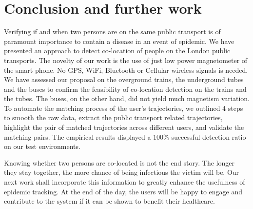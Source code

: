 \documentclass[conference]{IEEEtran}
\begin{document}
\section{Conclusion and further work}
Verifying if and when two persons are on the same public transport is of paramount importance to contain a disease in an event of epidemic. We have presented an approach to detect co-location of people on the London public transports. The novelty of our work is the use of just low power magnetometer of the smart phone. No GPS, WiFi, Bluetooth or Cellular wireless signals is needed. We have assessed our proposal on the overground trains, the underground tubes and the buses to confirm the feasibility of co-location detection on the trains and the tubes. The buses, on the other hand, did not yield much magnetism variation. To automate the matching process of the user's trajectories, we outlined 4 steps to smooth the raw data, extract the public transport related trajectories, highlight the pair of matched trajectories across different users, and validate the matching pairs. The empirical results displayed a 100\% successful detection ratio on our test environments.

Knowing whether two persons are co-located is not the end story. The longer they stay together, the more chance of being infectious the victim will be. Our next work shall incorporate this information to greatly enhance the usefulness of epidemic tracking. At the end of the day, the users will be happy to engage and contribute to the system if it can be shown to benefit their healthcare.


%
%
\end{document}
